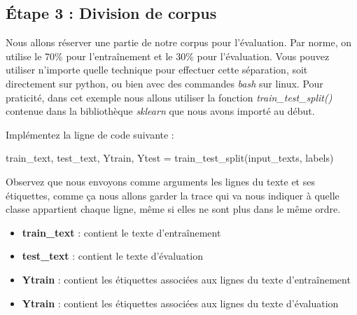 





\subsection{Étape 3 : Division de corpus}

Nous allons réserver une partie de notre corpus pour l'évaluation. Par norme, on utilise le 70\% pour l'entraînement et le 30\% pour l'évaluation. Vous pouvez utiliser n'importe quelle technique pour effectuer cette séparation, soit directement sur python, ou bien avec des commandes \textit{bash} sur linux. Pour praticité, dans cet exemple nous allons utiliser la fonction \textit{train\_test\_split()} contenue dans la bibliothèque \textit{sklearn} que nous avons importé au début. 

Implémentez la ligne de code suivante :

\begin{python}
train_text, test_text, Ytrain, Ytest = 
train_test_split(input_texts, labels)
\end{python}
Observez que nous envoyons comme arguments les lignes du texte et ses étiquettes, comme ça nous allons garder la trace qui va nous indiquer à quelle classe appartient chaque ligne, même si elles ne sont plus dans le même ordre.

\begin{itemize}
	\item \textbf{train\_text} : contient le texte d’entraînement
	\item \textbf{test\_text} : contient le texte d'évaluation
	\item \textbf{Ytrain} : contient les étiquettes associées aux lignes du texte d'entraînement
	\item \textbf{Ytrain} : contient les étiquettes associées aux lignes du texte d'évaluation
\end{itemize}

